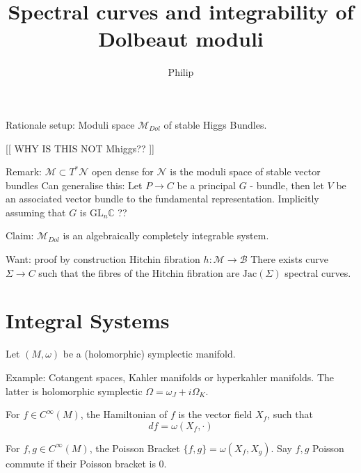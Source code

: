 % 


\title{Spectral curves and integrability of Dolbeaut moduli}
\author{Philip}
\date{}

 
\maketitle

Rationale setup:
Moduli space $\mathcal{M}_{Dol} $ of stable Higgs Bundles.

[[ WHY IS THIS NOT Mhiggs?? ]]

Remark:
$\mathcal{M} \subset T^* \mathcal{N} $ open dense for $\mathcal{N} $ is the moduli space of stable vector bundles
Can generalise this: 
Let $ P \rightarrow  C $ be a principal $G$ - bundle, 
then let $V$ be an associated vector bundle to the fundamental representation.
Implicitly assuming that $G$ is $\mathrm{GL}_n \mathbb{C} $ ??

Claim: $ \mathcal{M} _{Dol} $ is an algebraically completely integrable system. 

Want: proof by construction 
Hitchin fibration $h : \mathcal{M} \rightarrow \mathcal{B}$ 
There exists curve $ \Sigma \rightarrow  C $ such that the fibres of the Hitchin fibration are $\mathrm{Jac}(\Sigma) $ spectral curves. 

\section{Integral Systems} %

Let $(M,\omega) $ be a (holomorphic) symplectic manifold. 

Example: Cotangent spaces, Kahler manifolds or hyperkahler manifolds. 
The latter is holomorphic symplectic $\Omega = \omega_J + i \Omega_K $. 

\begin{definition}
     For $ f \in C^{\infty} (M) $, the Hamiltonian of $f$ is the vector field $X_f $, such that 
     \begin{equation}
            df = \omega(X_f, \cdot) 
     \end{equation}
\end{definition}

\begin{definition}
    For $ f,g \in C^{\infty}(M)$, the Poisson Bracket $\{f, g\} = \omega(X_f, X_g) $. 
    Say $f,g$ Poisson commute if their Poisson bracket is 0. 
\end{definition}

